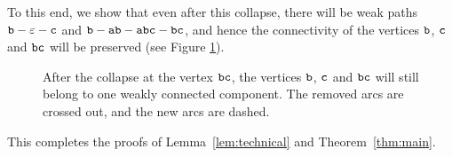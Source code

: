 To this end, we show that even after this collapse, there will be weak paths $ {\tt b} - \varepsilon - {\tt c} $ and $ {\tt b} - {\tt ab} - {\tt abc} - {\tt bc} $, and hence the connectivity of the vertices $ {\tt b} $, $ {\tt c} $ and $ {\tt bc} $ will be preserved (see Figure \ref{fig:lvl1final}).
\begin{figure}[ht]
\begin{center}

\end{center}

\caption{After the collapse at the vertex $ {\tt bc} $, the vertices $ {\tt b} $, $ {\tt c} $ and $ {\tt bc} $ will still belong to one weakly connected component. The removed arcs are crossed out, and the new arcs are dashed.}\label{fig:lvl1final}
\end{figure}

This completes the proofs of Lemma~\ref{lem:technical} and Theorem~\ref{thm:main}.